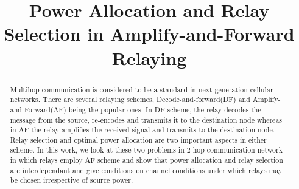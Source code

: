 \documentclass[conference]{IEEEtran}
\begin{document}
%
\title{Power Allocation and Relay Selection in
Amplify-and-Forward Relaying
}


\author{
}






\maketitle

\begin{abstract}
	Multihop communication is considered to be a standard in next generation
	cellular networks.  There are several relaying schemes,
	Decode-and-forward(DF) and Amplify-and-Forward(AF) being the popular ones.
	In DF scheme, the relay decodes the message from the source, re-encodes
	and transmits it to the destination node whereas in AF the relay amplifies
	the received signal and transmits to the destination node. Relay selection
	and optimal power allocation are two important aspects in either
	scheme. In this work, we look at these two problems in 2-hop communication
	network in which relays employ AF scheme and show that power allocation and
	relay selection are interdependant and give conditions on channel conditions
	under which relays may be chosen irrespective of source power.

\end{abstract}





%
\IEEEpeerreviewmaketitle
\end{document}
